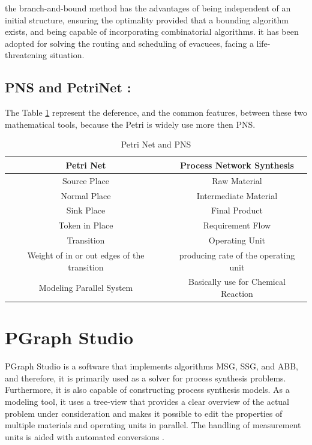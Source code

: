the branch-and-bound method has the
advantages of being independent of an initial structure, 
ensuring the optimality provided that a bounding algorithm exists, and being capable of incorporating
combinatorial algorithms\cite{algo}.
it has been adopted for solving the routing and scheduling of evacuees, facing a life-threatening situation\cite{pns4}. 

\subsection{PNS and PetriNet :} 
The Table \ref{tab:Petri Net and PNS} represent the deference, and the common features, between these two mathematical tools, because the Petri is widely use more then PNS.
\begin {table}[H] 
\begin{tabular}{cc}

\hline 
\textbf{Petri Net} & \textbf{Process Network Synthesis}\tabularnewline
\hline 
Source Place & Raw Material\tabularnewline
Normal Place & Intermediate Material\tabularnewline
Sink Place & Final Product\tabularnewline
Token in Place & Requirement Flow \tabularnewline
Transition & Operating Unit \tabularnewline
Weight of in or out edges of the transition & producing rate of the operating unit\tabularnewline
\hline 
Modeling Parallel System & Basically use for Chemical Reaction \tabularnewline
\hline 

\end{tabular}
\caption {Petri Net and PNS}
 \label{tab:Petri Net and PNS}
\end {table}



\section{PGraph Studio} 
PGraph Studio is a software that implements algorithms MSG, SSG, and ABB, and therefore, it is primarily
used as a solver for process synthesis problems. Furthermore, it is also capable of constructing process synthesis models.
As a modeling tool, it uses a tree-view that provides a clear overview of the actual problem under consideration and makes
it possible to edit the properties of multiple materials and operating units in parallel. The handling of measurement units
is aided with automated conversions \cite{ch3-pgraph2, Sitepgraph}.


